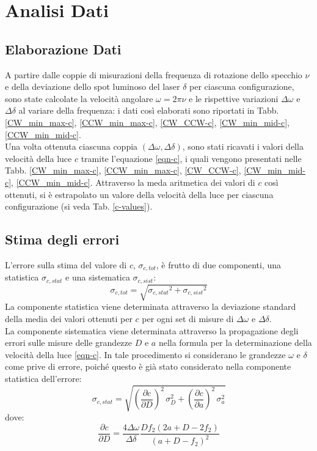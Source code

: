 \documentclass[]{article}
\let\oldsection\section%
\renewcommand{\section}{%
	\renewcommand{\theequation}{\thesection.\arabic{equation}}%
	\oldsection}%
\let\oldsubsection\subsection%
\renewcommand{\subsection}{%
	\renewcommand{\theequation}{\thesubsection.\arabic{equation}}%
	\oldsubsection}%
\begin{document}
    \section{Analisi Dati}

    \subsection{Elaborazione Dati}

    A partire dalle coppie di misurazioni della frequenza di rotazione dello specchio $ \nu $ e della deviazione dello spot luminoso del laser $ \delta $ per ciascuna configurazione, sono state calcolate la velocità angolare $ \omega = 2\pi\nu $ e le rispettive variazioni $ \Delta\omega $ e $ \Delta\delta $ al variare della frequenza: i dati così elaborati sono riportati in Tabb. \ref{CW_min_max-c}, \ref{CCW_min_max-c}, \ref{CW_CCW-c}, \ref{CW_min_mid-c}, \ref{CCW_min_mid-c}. \\
    Una volta ottenuta ciascuna coppia $ \left(\Delta\omega,\Delta\delta\right) $, sono stati ricavati i valori della velocità della luce $c$ tramite l'equazione \ref{eqn-c}, i quali vengono presentati nelle Tabb. \ref{CW_min_max-c}, \ref{CCW_min_max-c}, \ref{CW_CCW-c}, \ref{CW_min_mid-c}, \ref{CCW_min_mid-c}. Attraverso la meda aritmetica dei valori di $c$ così ottenuti, si è estrapolato un valore della velocità della luce per ciascuna configurazione (si veda Tab. \ref{c-values}).

    \subsection {Stima degli errori}

    L'errore sulla stima del valore di $ c $, $ \sigma_{c,tot} $, è frutto di due componenti, una statistica $\sigma_{c,stat}$ e una sistematica $\sigma_{c,sist}$:
    \begin{equation}
        \label{sigma_tot}
        \sigma_{c,tot} = \sqrt{ {\sigma_{c,stat}} ^2 + {\sigma_{c,sist}} ^2 } 
    \end{equation}
    La componente statistica viene determinata attraverso la deviazione standard della media dei valori ottenuti per $c$ per ogni set di misure di $ \Delta \omega $ e $ \Delta \delta $. \\
    La componente sistematica viene determinata attraverso la propagazione degli errori sulle misure delle grandezze $D$ e $a$ nella formula per la determinazione della velocità della luce \ref{eqn-c}. In tale procedimento si considerano le grandezze  $\omega$ e $\delta$ come prive di errore, poiché questo è già stato considerato nella componente statistica dell'errore:
    \begin{equation}
        \label{sigma-stat}
        \sigma_{c,stat} = \sqrt{ \left(\frac{\partial c}{\partial D}\right)^2 \, \sigma_D ^2 + \left(\frac{\partial c}{\partial a}\right)^2 \, \sigma_a ^2 } 
    \end{equation}
    dove:
    \begin{equation}
        \label{eqn-propD}
        \frac{\partial c}{\partial D} = \frac{4\Delta \omega}{\Delta \delta} \frac{D f_2 \left(2a + D -2f_2\right)}{\left(a + D -f_2\right)^2}
    \end{equation}
\end{document}
